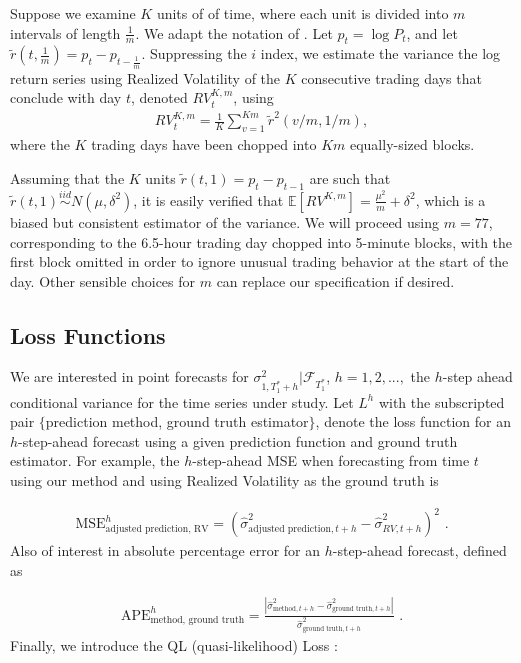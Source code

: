 \documentclass{uiucthesis2021}
\newcommand{\simiid}{\stackrel{iid}{\sim}} %
\def\E{\mathbb{E}} %
\theoremstyle{definition}
\begin{document}
    Suppose we examine $K$ units of of time, where each unit is divided into $m$ intervals of length $\frac{1}{m}$.  We adapt the notation of \cite[][]{andersen2008realized}. Let $p_{t} = \log{P_{t}}$, and let $\tilde{r}(t,\frac{1}{m}) = p_{t} - p_{t-\frac{1}{m}}$.  Suppressing the $i$ index, we estimate the variance the log return series using Realized Volatility of the $K$ consecutive trading days that conclude with day $t$, denoted $RV_{t}^{K,m}$, using    
   \begin{align*}
    RV_{t}^{K,m} = \frac{1}{K}\sum^{Km}_{v=1}\tilde{r}^{2}(v/m,1/m),
   \end{align*}
    where the $K$ trading days have been chopped into $Km$ equally-sized blocks.

    Assuming that the $K$ units $\tilde{r}(t, 1) = p_{t} - p_{t-1}$ are such that $\tilde{r}(t, 1) \simiid N(\mu, \delta^{2})$, it is easily verified that $\E[RV^{K,m}] = \frac{\mu^{2}}{m} + \delta^{2}$, which is a biased but consistent estimator of the variance.  We will proceed using $m = 77$, corresponding to the 6.5-hour trading day chopped into 5-minute blocks, with the first block omitted in order to ignore unusual trading behavior at the start of the day. Other sensible choices for $m$ can replace our specification if desired.

\subsection{Loss Functions}\label{loss_function}

We are interested in point forecasts for $\sigma^{2}_{1,T_{1}^{*}+h}|\mathcal{F}_{T_{1}^{*}}$, $h=1,2,...,$ the $h$-step ahead conditional variance for the time series under study.  Let $L^{h}$ with the subscripted pair $\{$prediction method, ground truth estimator$\}$, denote the loss function for an $h$-step-ahead forecast using a given prediction function and ground truth estimator.  For example, the $h$-step-ahead MSE when forecasting from time $t$ using our method and using Realized Volatility as the ground truth is

\begin{align*} 
  \text{MSE}^{h}_{\text{adjusted prediction, RV}} = (\hat\sigma^{2}_{\text{adjusted prediction},t+h} - \hat\sigma^{2}_{RV,t+h})^{2}\text{ .}
\end{align*}
Also of interest in absolute percentage error for an $h$-step-ahead forecast, defined as

\begin{align*}
\text{APE}^{h}_{\text{method, ground truth}} = \frac{|\hat\sigma^{2}_{\text{method},t+h} - \hat\sigma^{2}_{\text{ground truth},t+h}|}{\hat\sigma^{2}_{\text{ground truth},t+h}}\text{ .}
\end{align*}
Finally, we introduce the QL (quasi-likelihood) Loss \cite[][]{brownlees2011practical}:
\end{document}
